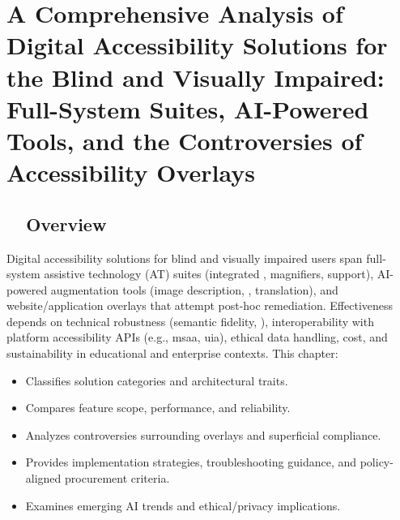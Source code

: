 \chapter{A Comprehensive Analysis of Digital Accessibility Solutions for the Blind and Visually Impaired: Full-System Suites, AI-Powered Tools, and the Controversies of Accessibility Overlays}
\label{chap:\gidx{accessibility}{accessibility}-solutions}

\section{~~Overview}
\label{sec:ch28-overview}
Digital accessibility solutions for blind and visually impaired users span full-system assistive technology (AT) suites (integrated , magnifiers,  support), AI-powered augmentation tools (image description, , translation), and website/application overlays that attempt post-hoc remediation. Effectiveness depends on technical robustness (semantic fidelity, ), interoperability with platform accessibility APIs (e.g., \gls{msaa}, \gls{uia}), ethical data handling, cost, and sustainability in educational and enterprise contexts. This chapter:
\begin{itemize}
	\item Classifies solution categories and architectural traits.
	\item Compares feature scope, performance, and reliability.
	\item Analyzes controversies surrounding overlays and superficial compliance.
	\item Provides implementation strategies, troubleshooting guidance, and policy-aligned procurement criteria.
	\item Examines emerging AI trends and ethical/privacy implications.
\end{itemize}

